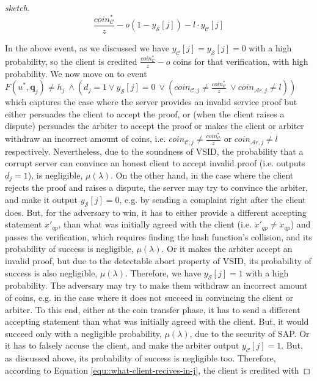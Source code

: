 \begin{proof}[sketch]
  \begin{equation}\label{equ::what-client-recives-in-j}
   \frac{coin^{\scriptscriptstyle *}_{\scriptscriptstyle\mathcal C}}{z}-o(1-y_{\scriptscriptstyle\mathcal S}[j])-l\cdot y_{\scriptscriptstyle\mathcal C}[j]
     \end{equation}
     
     In the above event, as we discussed we have  $y_{\scriptscriptstyle\mathcal{C}}[j]=y_{\scriptscriptstyle\mathcal{S}}[j]=0$ with a high probability, so the client is credited $\frac{coin_{\scriptscriptstyle\mathcal C}^{\scriptscriptstyle*}}{z}-o$ coins for that verification, with  high probability. We now move on to event $F(u^{\scriptscriptstyle *}, \bm{q}_{\scriptscriptstyle j})\neq h_{\scriptscriptstyle j} \ \wedge (d_{\scriptscriptstyle j}=1	\vee y_{\scriptscriptstyle \mathcal S}[j]=0 \ \vee (coin_{\scriptscriptstyle\mathcal{C},j}\neq \frac{coin_{\scriptscriptstyle\mathcal C}^{\scriptscriptstyle*}}{z} \ \vee  coin_{\scriptscriptstyle\mathcal{A}r,j}\neq l))$ which captures the case where the server provides an invalid service proof but either persuades the client to accept the proof, or  (when the client raises a dispute)  persuades the arbiter to accept the proof or makes the client or arbiter withdraw an incorrect amount of coins, i.e.    $coin_{\scriptscriptstyle\mathcal{C},j}\neq \frac{coin_{\scriptscriptstyle\mathcal C}^{\scriptscriptstyle*}}{z}$ or $coin_{\scriptscriptstyle\mathcal{A}r,j}\neq l$ respectively.   Nevertheless, due to the soundness of VSID, the probability that a corrupt server can convince an honest client to accept invalid proof (i.e. outputs $d_{\scriptscriptstyle j}=1$), is negligible, $\mu(\lambda)$. On the other hand, in the case where the client rejects the proof and raises a dispute, the server may try to convince the arbiter, and make it output $y_{\scriptscriptstyle \mathcal S}[j]=0$, e.g. by sending a complaint right after the client does. But, for the adversary to win, it has to either provide a different accepting statement $\ddot{x}'_{\scriptscriptstyle qp}$, than what was initially agreed with the client (i.e. $\ddot{x}'_{\scriptscriptstyle qp}\neq \ddot{x}_{\scriptscriptstyle qp}$) and passes the verification, which   requires finding the hash function's collision, and its probability of success is negligible, $\mu(\lambda)$. Or it makes the arbiter  accept an invalid proof, but due to the detectable abort property of VSID, its probability of success is also negligible, $\mu(\lambda)$. Therefore, we have $y_{\scriptscriptstyle \mathcal S}[j]=1$  with a high probability. The adversary may  try to  make them withdraw an incorrect amount of coins, e.g. in the case where it does not succeed in convincing the client or arbiter. To this end, either at the coin transfer phase, it has to send a  different accepting statement  than what was initially agreed with the client. But, it would succeed only with a negligible probability, $\mu(\lambda)$, due to the security of SAP. Or it has to falsely accuse the client, and make the arbiter  output $y_{\scriptscriptstyle \mathcal C}[j]=1$. But, as discussed above, its probability of success is negligible too. Therefore, according to Equation \ref{equ::what-client-recives-in-j}, the client is credited with 
\end{proof}
